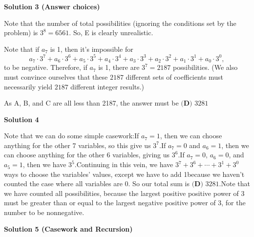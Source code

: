 \begin{enumerate}
 



\textbf{Solution 3 (Answer choices)}

Note that the number of total possibilities (ignoring the conditions set by the problem) is $3^8=6561$. So, E is clearly unrealistic. 

 Note that if $a_7$ is 1, then it's impossible for 
 \[a_7\cdot3^7+a_6\cdot3^6+a_5\cdot3^5+a_4\cdot3^4+a_3\cdot3^3+a_2\cdot3^2+a_1\cdot3^1+a_0\cdot3^0,\] to be negative. Therefore, if $a_7$ is 1, there are $3^7=2187$ possibilities. (We also must convince ourselves that these $2187$ different sets of coefficients must necessarily yield $2187$ different integer results.)

 As A, B, and C are all less than 2187, the answer must be $\boxed{\textbf{(D) } 3281}$




\textbf{Solution 4}

Note that we can do some simple casework:If $a_7=1$, then we can choose anything for the other 7 variables, so this give us $3^7$.If $a_7=0$ and $a_6=1$, then we can choose anything for the other 6 variables, giving us $3^6$.If $a_7=0$, $a_6=0$, and $a_5=1$, then we have $3^5$.Continuing in this vein, we have $3^7+3^6+\cdots+3^1+3^0$ ways to choose the variables' values, except we have to add 1because we haven't counted the case where all variables are 0. So our total sum is $\boxed{\textbf{(D) } 3281}$.Note that we have counted all possibilities, because the largest positive positive power of 3 must be greater than or equal to the largest negative positive power of 3, for the number to be nonnegative.

 



\textbf{Solution 5 (Casework and Recursion)}


\end{enumerate}
